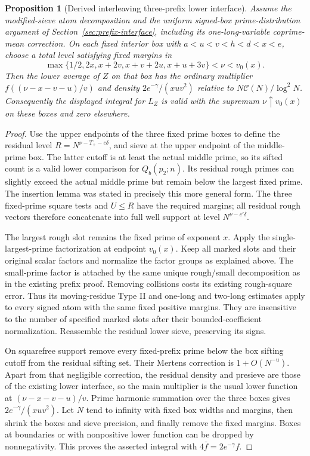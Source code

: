 \documentclass[11pt]{article}
\newtheorem{proposition}[theorem]{Proposition}
\begin{document}
\begin{proposition}[Derived interleaving three-prefix lower interface]
Assume the modified-sieve atom decomposition and the uniform
signed-box prime-distribution argument of
Section~\ref{sec:prefix-interface}, including its one-long-variable
coprime-mean correction.  On each fixed interior box with
$a<u<v<h<d<x<e$, choose a total level satisfying fixed margins in
\[
 \max\{1/2,2x,x+2v,x+v+2u,x+u+3v\}<\nu<v_0(x).
\]
Then the lower average of $Z$ on that box has the ordinary multiplier
$f((\nu-x-v-u)/v)$ and density
$2e^{-\gamma}/(xuv^2)$ relative to $N\mathcal C(N)/\log^2N$.
Consequently the displayed integral for $L_Z$ is valid with
the supremum $\nu\uparrow v_0(x)$ on these boxes and zero elsewhere.
\end{proposition}

\begin{proof}
Use the upper endpoints of the three fixed prime boxes to define the
residual level $R=N^{\nu-T_+-c\delta}$, and sieve at the upper endpoint
of the middle-prime box.  The latter cutoff is at least the actual
middle prime, so its sifted count is a valid lower comparison for
$Q_b(p_2;n)$.  Its residual rough primes can slightly exceed the actual
middle prime but remain below the largest fixed prime.  The insertion
lemma was stated in precisely this more general form.  The three
fixed-prime square tests and $U\le R$ have the required margins;
all residual rough vectors therefore concatenate into full well
support at level $N^{\nu-c'\delta}$.

The largest rough slot remains the fixed prime of exponent $x$.
Apply the single-largest-prime factorization at endpoint $v_0(x)$.
Keep all marked slots and their original scalar factors and normalize
the factor groups as explained above.  The small-prime factor is
attached by the same unique rough/small decomposition as in the
existing prefix proof.  Removing collisions costs its existing
rough-square error.  Thus its moving-residue Type II and one-long
and two-long estimates apply to every signed atom with the same
fixed positive margins.  They are insensitive to the number of
specified marked slots after their bounded-coefficient normalization.
Reassemble the residual lower sieve, preserving its signs.

On squarefree support remove every fixed-prefix prime below the
box sifting cutoff from the residual sifting set.  Their Mertens correction is
$1+O(N^{-u})$.  Apart from that negligible correction, the residual
density and presieve are those of the existing lower interface,
so the main multiplier is the usual lower function at
$(\nu-x-v-u)/v$.  Prime harmonic summation over the three boxes
gives $2e^{-\gamma}/(xuv^2)$.  Let $N$ tend to infinity with fixed
box widths and margins, then shrink the boxes and sieve precision,
and finally remove the fixed margins.  Boxes at boundaries or with
nonpositive lower function can be dropped by nonnegativity.  This
proves the asserted integral with $4\bar f=2e^{-\gamma}f$.
\end{proof}
\end{document}
